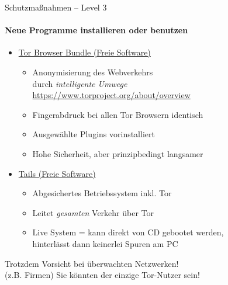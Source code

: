 \begin{frame}{Schutzmaßnahmen -- Level 3}
\framesubtitle{Neue Programme installieren oder benutzen}
  \begin{itemize}
    \item \href{https://www.torproject.org}{Tor Browser Bundle (Freie Software)}
    \begin{itemize}
      \item Anonymisierung des Webverkehrs\\durch \emph{\glqq intelligente Umwege\grqq}\\
        {\small\url{https://www.torproject.org/about/overview}}
      \item Fingerabdruck bei allen Tor Browsern identisch
      \item Ausgewählte Plugins vorinstalliert
      \item Hohe Sicherheit, aber prinzipbedingt langsamer
    \end{itemize}
    \pause
    \item \href{https://tails.boum.org}{Tails (Freie Software)}
    \begin{itemize}
      \item Abgesichertes Betriebssystem inkl. Tor
      \item Leitet \emph{gesamten} Verkehr über Tor
      \item Live System = kann direkt von CD gebootet werden,\\ hinterlässt dann keinerlei Spuren am PC
    \end{itemize}
  \end{itemize}
  Trotzdem Vorsicht bei überwachten Netzwerken!\\ (z.B. Firmen) Sie könnten der einzige Tor-Nutzer sein!
\end{frame}

\endinput
